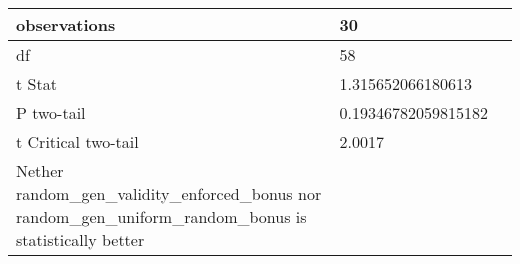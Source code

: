 \documentclass[11pt]{article}
\begin{document}
\begin{table}[]
{\begin{tabular}{|l|l|l|}
    observations                                                                                                  & 30                                  &                                        \\ \hline
    df                                                                                                            & 58                                  &                                        \\ \hline
    t Stat                                                                                                        & 1.315652066180613                   &                                        \\ \hline
    P two-tail                                                                                                    & 0.19346782059815182                 &                                        \\ \hline
    t Critical two-tail                                                                                           & 2.0017                              &                                        \\ \hline
    Nether random\_gen\_validity\_enforced\_bonus nor random\_gen\_uniform\_random\_bonus is statistically better &                                     &                                        \\ \hline
    \end{tabular}%
    }
\end{table}
\end{document}
